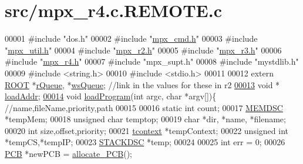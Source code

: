 \hypertarget{mpx__r4_8c_8_r_e_m_o_t_e_8c_source}{
\section{src/mpx\_\-r4.c.REMOTE.c}
}

\begin{DoxyCode}
00001 \textcolor{preprocessor}{#include "dos.h"}
00002 \textcolor{preprocessor}{#include "\hyperlink{mpx__cmd_8h}{mpx_cmd.h}"}
00003 \textcolor{preprocessor}{#include "\hyperlink{mpx__util_8h}{mpx_util.h}"}
00004 \textcolor{preprocessor}{#include "\hyperlink{mpx__r2_8h}{mpx_r2.h}"}
00005 \textcolor{preprocessor}{#include "\hyperlink{_m_p_x___r3_8_h}{mpx_r3.h}"}
00006 \textcolor{preprocessor}{#include "\hyperlink{mpx__r4_8h}{mpx_r4.h}"}
00007 \textcolor{preprocessor}{#include "mpx\_supt.h"}
00008 \textcolor{preprocessor}{#include "mystdlib.h"}
00009 \textcolor{preprocessor}{#include <string.h>}
00010 \textcolor{preprocessor}{#include <stdio.h>}
00011 
00012 \textcolor{keyword}{extern} \hyperlink{structroot}{ROOT} *\hyperlink{mpx__r2_8c_afe54c168944e64a28d76b6e4d3abb391}{rQueue}, *\hyperlink{mpx__r2_8c_ac4950750e25f86d7ee69d6bcca87ef5f}{wsQueue}; \textcolor{comment}{//link in the values for these in r2}
\hypertarget{mpx__r4_8c_8_r_e_m_o_t_e_8c_source_l00013}{}\hyperlink{mpx__r4_8c_8_r_e_m_o_t_e_8c_a872ebd998619bdbaa3b905883e648502}{00013} \textcolor{keywordtype}{void} * \hyperlink{mpx__r4_8c_a872ebd998619bdbaa3b905883e648502}{loadAddr};
\hypertarget{mpx__r4_8c_8_r_e_m_o_t_e_8c_source_l00014}{}\hyperlink{mpx__r4_8c_8_r_e_m_o_t_e_8c_a794e5f6c45d4d9b18fff6a530ce90f86}{00014} \textcolor{keywordtype}{void} \hyperlink{mpx__r4_8c_a794e5f6c45d4d9b18fff6a530ce90f86}{loadProgram}(\textcolor{keywordtype}{int} argc, \textcolor{keywordtype}{char} *argv[])\{ \textcolor{comment}{//name,fileName,priority,path}
00015         
00016         \textcolor{keyword}{static} \textcolor{keywordtype}{int} count;
00017         \hyperlink{structmem}{MEMDSC} *tempMem;
00018         \textcolor{keywordtype}{unsigned} \textcolor{keywordtype}{char} temptop;
00019         \textcolor{keywordtype}{char} *dir, *name, *filename;
00020         \textcolor{keywordtype}{int} size,offset,priority;
00021         \hyperlink{structcontext}{tcontext} *tempContext;
00022         \textcolor{keywordtype}{unsigned} \textcolor{keywordtype}{int} *tempCS,*tempIP;
00023         \hyperlink{structstack}{STACKDSC} *temp;
00024         
00025         \textcolor{keywordtype}{int} err = 0;
00026         \hyperlink{structprocess}{PCB} *newPCB = \hyperlink{mpx__r2_8c_a58a8a1ea0a96b9ecf0be29179a5a0a1e}{allocate_PCB}();

\end{DoxyCode}
